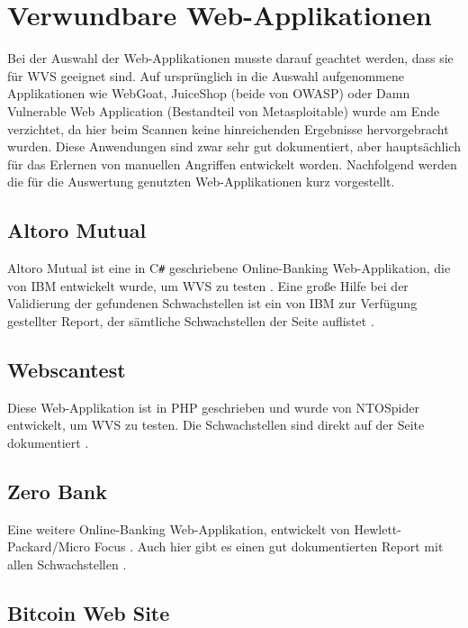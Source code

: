 \documentclass[12pt,oneside,a4paper,parskip]{scrbook}
\begin{document}
\section{Verwundbare Web-Applikationen}
  Bei der Auswahl der Web-Applikationen musste darauf geachtet werden, dass sie für WVS geeignet sind. Auf ursprünglich in die Auswahl aufgenommene Applikationen wie WebGoat, JuiceShop (beide von OWASP) oder Damn Vulnerable Web Application (Bestandteil von Metasploitable) wurde am Ende verzichtet, da hier beim Scannen keine hinreichenden Ergebnisse hervorgebracht wurden. Diese Anwendungen  sind zwar sehr gut dokumentiert, aber hauptsächlich für das Erlernen von manuellen Angriffen entwickelt worden.
  Nachfolgend werden die für die Auswertung genutzten Web-Applikationen kurz vorgestellt.
  \subsection{Altoro Mutual}
    Altoro Mutual ist eine in C\texttt{\#} geschriebene Online-Banking Web-Applikation, die von IBM entwickelt wurde, um WVS zu testen \cite{Altoro}. Eine große Hilfe bei der Validierung der gefundenen Schwachstellen ist ein von IBM zur Verfügung gestellter Report, der sämtliche Schwachstellen der Seite auflistet \cite{IBM}.
  \subsection{Webscantest}
    Diese Web-Applikation ist in PHP geschrieben und wurde von NTOSpider entwickelt, um WVS zu testen. Die Schwachstellen sind direkt auf der Seite dokumentiert \cite{Webscantest}.
  \subsection{Zero Bank}
    Eine weitere Online-Banking Web-Applikation, entwickelt von Hewlett-Packard/Micro Focus \cite{Zero}. Auch hier gibt es einen gut dokumentierten Report mit allen Schwachstellen \cite{ZeroReport}.
  \subsection{Bitcoin Web Site}  \cite{Aspnet}
\end{document}
